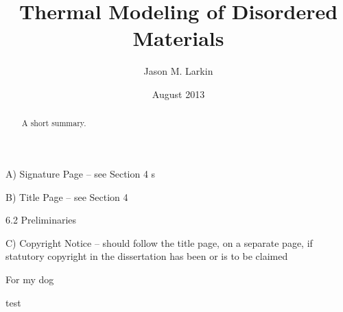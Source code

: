 \documentclass[12pt]{cmuthesis}
\begin{document}
 
\frontmatter

A) Signature Page – see Section 4
s
\pagestyle{empty}

B) Title Page – see Section 4
\title{ %
{\bf Thermal Modeling of Disordered Materials}}
\author{Jason M. Larkin}
\date{August 2013}
\trnumber{}




\support{}
\disclaimer{}

6.2 Preliminaries



C) Copyright Notice – should follow the title page, on a separate page, if statutory copyright in the dissertation has been or is to be claimed



\maketitle

\begin{dedication}
For my dog
\end{dedication}

\pagestyle{plain} %


\begin{abstract}
A short summary.
\end{abstract}

\begin{acknowledgments}
test
\end{acknowledgments}
\end{document}
